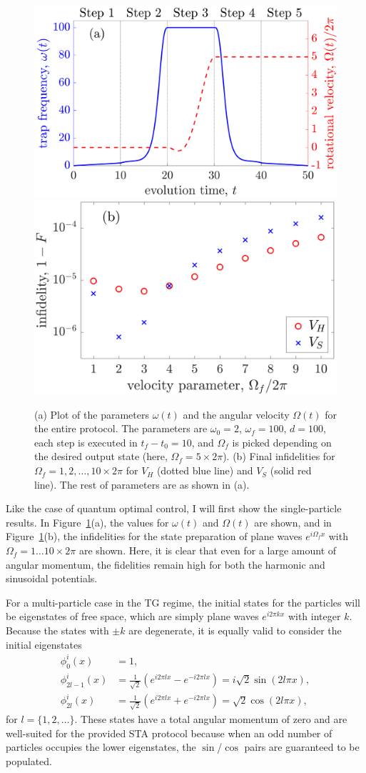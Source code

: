 \begin{figure}
\centering
\includegraphics[width=0.45\linewidth]{data/1d/fig5.png}
\includegraphics[width= 0.45\linewidth]{data/1d/fig6.png}
\caption{
(a) Plot of the parameters $\omega(t)$ and the angular velocity $\Omega(t)$ for the entire protocol.
The parameters are $\omega_0=2$, $\omega_f=100$, $d=100$, each step is executed in $t_f-t_0=10$, and $\Omega_f$ is picked depending on the desired output state (here, $\Omega_f=5 \times 2\pi$).
(b) Final infidelities for $\Omega_f=1,2,\ldots,10 \times 2\pi$ for $V_H$ (dotted blue line) and $V_S$ (solid red line).
The rest of parameters are as shown in (a).
}
\label{fig:final+param}
\end{figure}

Like the case of quantum optimal control, I will first show the single-particle results.
In Figure~\ref{fig:final+param}(a), the values for $\omega(t)$ and $\Omega(t)$ are shown, and
in Figure~\ref{fig:final+param}(b), the infidelities for the state preparation of plane waves $e^{i \Omega_f x}$ with $\Omega_f=1\ldots10 \times 2 \pi$ are shown.
Here, it is clear that even for a large amount of angular momentum, the fidelities remain high for both the harmonic and sinusoidal potentials.

For a multi-particle case in the TG regime, the initial states for the particles will be eigenstates of free space, which are simply plane waves $e^{i 2 \pi k x}$ with integer $k$.
Because the states with $\pm k$ are degenerate, it is equally valid to consider the initial eigenstates
\begin{align}
\phi^i_0(x)&=1,\\
\phi^i_{2l-1}(x)&=\frac{1}{\sqrt 2} \left( e^{i 2 \pi l x}-e^{-i 2 \pi l x} \right)= i \sqrt{2} \sin(2 l \pi x), \\
\phi^i_{2l}(x)&= \frac{1}{\sqrt 2}\left( e^{i 2 \pi l x}+e^{-i 2 \pi l x} \right) = \sqrt{2} \cos(2 l \pi x),
\end{align}
for $l=\{1,2,\ldots\}$.
These states have a total angular momentum of zero and are well-suited for the provided STA protocol because when an odd number of particles occupies the lower eigenstates, the $\sin$/$\cos$ pairs are guaranteed to be populated.

